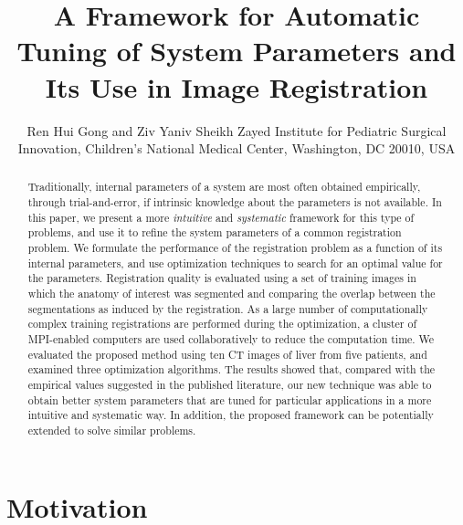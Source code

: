 \documentclass[]{spie}  %
\title{A Framework for Automatic Tuning of System Parameters and Its Use in Image Registration}
\author{Ren Hui Gong\supit{a} and Ziv Yaniv\supit{a}
\skiplinehalf
\supit{a}Sheikh Zayed Institute for Pediatric Surgical Innovation, Children's National Medical Center, Washington, DC 20010, USA
}
\begin{document}
 
\maketitle 

\begin{abstract}
Traditionally, internal parameters of a system are most often obtained empirically, through trial-and-error, if intrinsic knowledge about the parameters is not available. In this paper, we present a more \emph{intuitive} and \emph{systematic} framework for this type of problems, and use it to refine the system parameters of a common registration problem. We formulate the performance of the registration problem as a function of its internal parameters, and use optimization techniques to search for an optimal value for the parameters. Registration quality is evaluated using a set of training images in which the anatomy of interest was segmented and comparing the overlap between the segmentations as induced by the registration. As a large number of computationally complex training registrations are performed during the optimization, a cluster of MPI-enabled computers are used collaboratively to reduce the computation time. We evaluated the proposed method using ten CT images of liver from five patients, and examined three optimization algorithms. The results showed that, compared with the empirical values suggested in the published literature, our new technique was able to obtain better system parameters that are tuned for particular applications in a more intuitive and systematic way. In addition, the proposed framework can be potentially extended to solve 
similar problems. 
\end{abstract}



\section{Motivation}
\end{document}
